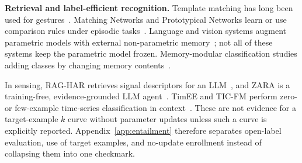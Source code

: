 \textbf{Retrieval and label-efficient recognition.}
Template matching has long been used for gestures~\cite{uwave,junker,warpinglcss}. Matching Networks
and Prototypical Networks learn or use comparison rules under episodic tasks~\cite{matchingnet,protonet}.
Language and vision systems augment parametric models with external non-parametric
memory~\cite{knnlm,rag,retro,knnvision,reco}; not all of these systems keep the parametric model
frozen. Memory-modular classification studies adding classes by changing memory
contents~\cite{memorymodular}.

In sensing, RAG-HAR retrieves signal descriptors for an LLM~\cite{raghar}, and ZARA is a
training-free, evidence-grounded LLM agent~\cite{zara}. TimEE and TIC-FM perform zero- or
few-example time-series classification in context~\cite{timee,ticfm}. These are not evidence for a
target-example $k$ curve without parameter updates unless such a curve is explicitly reported.
Appendix~\ref{app:entailment} therefore separates open-label evaluation, use of target examples,
and no-update enrollment instead of collapsing them into one checkmark.
